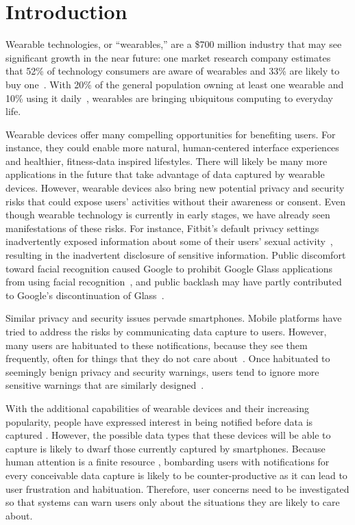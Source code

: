 
\section{Introduction}

Wearable technologies, or ``wearables,'' are a \$700 million industry \cite{cmo} that may see significant growth in the near future: one market research company estimates that 52\% of technology consumers are aware of wearables and 33\% are likely to buy one~\cite{NPD}. With 20\% of the general population owning at least one wearable and 10\% using it daily~\cite{WearableStatNews}, wearables are bringing ubiquitous computing to everyday life.


Wearable devices offer many compelling opportunities for benefiting users.  For instance, they could enable more natural, human-centered interface experiences and healthier, fitness-data inspired lifestyles. There will likely be many more applications in the future that take advantage of data captured by wearable devices. However, wearable devices also bring new potential privacy and security risks that could expose users' activities without their awareness or consent. Even though wearable technology is currently in early stages, we have already seen manifestations of these risks. For instance, Fitbit's default privacy settings inadvertently exposed information about some of their users' sexual activity~\cite{Fitbit}, resulting in the inadvertent disclosure of sensitive information. Public discomfort toward facial recognition caused Google to prohibit Google Glass applications from using facial recognition~\cite{GlassDetection}, and public backlash may have partly contributed to Google's discontinuation of Glass~\cite{1_russell_2014, 16_gross_2014}.

Similar privacy and security issues pervade smartphones. Mobile platforms have tried to address the risks by communicating data capture to users. However, many users are habituated to these notifications, because they see them frequently, often for things that they do not care about~\cite{felt2012android}. Once habituated to seemingly benign privacy and security warnings, users tend to ignore more sensitive warnings that are similarly designed~\cite{Egelman08}.

With the additional capabilities of wearable devices and their increasing popularity, people have expressed interest in being notified before data is captured \cite{denning2014situ}. However, the possible data types that these devices will be able to capture is likely to dwarf those currently captured by smartphones. Because human attention is a finite resource \cite{bohme2011security}, bombarding users with notifications for every conceivable data capture is likely to be counter-productive as it can lead to user frustration and habituation. Therefore, user concerns need to be investigated so that systems can warn users only about the situations they are likely to care about.

